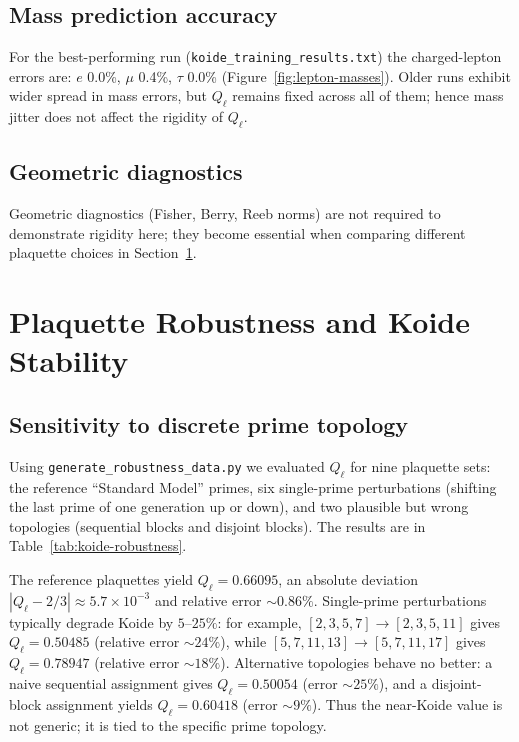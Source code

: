 \documentclass[12pt]{article}
\begin{document}
\subsection{Mass prediction accuracy}
For the best-performing run
(\texttt{koide\_training\_results.txt}) the charged-lepton
errors are: $e$ 0.0\%, $\mu$ 0.4\%, $\tau$ 0.0\% (Figure~\ref{fig:lepton-masses}).
Older runs exhibit wider spread in mass errors, but $Q_\ell$ remains fixed across
all of them; hence mass jitter does not affect the rigidity of $Q_\ell$.

\subsection{Geometric diagnostics}
Geometric diagnostics (Fisher, Berry, Reeb norms) are not required to
demonstrate rigidity here; they become essential when comparing different
plaquette choices in Section~\ref{sec:robustness}.

\section{Plaquette Robustness and Koide Stability}
\label{sec:robustness}

\subsection{Sensitivity to discrete prime topology}
Using \texttt{generate\_robustness\_data.py} we evaluated $Q_\ell$ for nine
plaquette sets: the reference “Standard Model” primes, six single-prime
perturbations (shifting the last prime of one generation up or down), and two
plausible but wrong topologies (sequential blocks and disjoint blocks). The
results are in Table~\ref{tab:koide-robustness}.

The reference plaquettes yield $Q_\ell = 0.66095$, an absolute deviation
$|Q_\ell-2/3| \approx 5.7\times 10^{-3}$ and relative error $\sim 0.86\%$.
Single-prime perturbations typically degrade Koide by $5$--$25\%$: for example,
$[2,3,5,7]\!\rightarrow\![2,3,5,11]$ gives $Q_\ell = 0.50485$ (relative error
$\sim 24\%$), while $[5,7,11,13]\!\rightarrow\![5,7,11,17]$ gives
$Q_\ell = 0.78947$ (relative error $\sim 18\%$). Alternative topologies behave
no better: a naive sequential assignment gives $Q_\ell = 0.50054$ (error
$\sim 25\%$), and a disjoint-block assignment yields $Q_\ell = 0.60418$ (error
$\sim 9\%$). Thus the near-Koide value is not generic; it is tied to the
specific prime topology.
\end{document}
